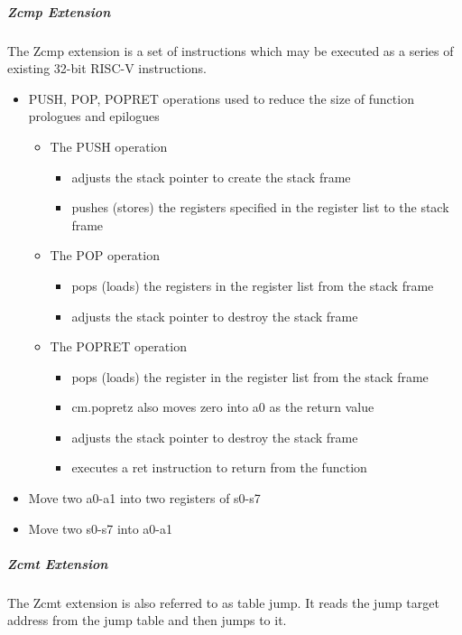 \documentclass[main\_\_EN.tex]{subfiles}
\begin{document}
\subparagraph{Zcmp Extension}

The Zcmp extension is a set of instructions which may be executed as a series of existing 32-bit RISC-V instructions.

\begin{itemize}
    \item PUSH, POP, POPRET operations used to reduce the size of function prologues and epilogues
        \begin{itemize}
            \item The PUSH operation
                \begin{itemize}
                    \item adjusts the stack pointer to create the stack frame
                    \item pushes (stores) the registers specified in the register list to the stack frame
                \end{itemize}
            \item The POP operation
                \begin{itemize}
                    \item pops (loads) the registers in the register list from the stack frame
                    \item adjusts the stack pointer to destroy the stack frame
                \end{itemize}
            \item The POPRET operation
                \begin{itemize}
                    \item pops (loads) the register in the register list from the stack frame
                    \item cm.popretz also moves zero into a0 as the return value
                    \item adjusts the stack pointer to destroy the stack frame
                    \item executes a ret instruction to return from the function
                \end{itemize}
        \end{itemize}
    \item Move two a0-a1 into two registers of s0-s7
    \item Move two s0-s7 into a0-a1
\end{itemize}

\subparagraph{Zcmt Extension}

The Zcmt extension is also referred to as table jump. It reads the jump target address from the jump table and then jumps to it.
\end{document}
